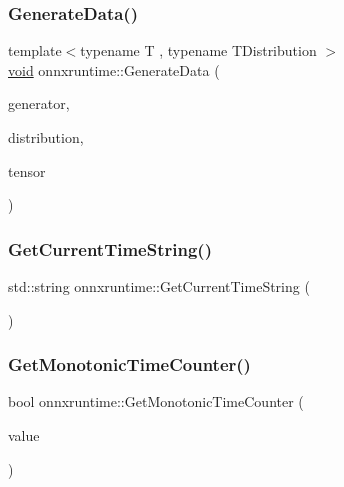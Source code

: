 \mbox{\label{namespaceonnxruntime_af375f3bf9afb474b936f8aa24dff75d8}} 
\subsubsection{\texorpdfstring{Generate\+Data()}{GenerateData()}\hspace{0.1cm}{\footnotesize\ttfamily [2/2]}}
{\footnotesize\ttfamily template$<$typename T , typename T\+Distribution $>$ \\
\mbox{\hyperlink{mlasi_8h_a88f941d423cb2a819b70a1358982b1a6}{void}} onnxruntime\+::\+Generate\+Data (\begin{DoxyParamCaption}\item[{std\+::default\+\_\+random\+\_\+engine}]{generator,  }\item[{T\+Distribution}]{distribution,  }\item[{\mbox{\hyperlink{classonnxruntime_1_1Tensor}{Tensor}} \&}]{tensor }\end{DoxyParamCaption})}

\mbox{\label{namespaceonnxruntime_aeded1386a822529bd9acd10c9148c04a}} 
\subsubsection{\texorpdfstring{Get\+Current\+Time\+String()}{GetCurrentTimeString()}}
{\footnotesize\ttfamily std\+::string onnxruntime\+::\+Get\+Current\+Time\+String (\begin{DoxyParamCaption}{ }\end{DoxyParamCaption})\hspace{0.3cm}{\ttfamily [inline]}}

\mbox{\label{namespaceonnxruntime_af6a8fa578d822eb4d52eaffbcded54cf}} 
\subsubsection{\texorpdfstring{Get\+Monotonic\+Time\+Counter()}{GetMonotonicTimeCounter()}}
{\footnotesize\ttfamily bool onnxruntime\+::\+Get\+Monotonic\+Time\+Counter (\begin{DoxyParamCaption}\item[{\mbox{\hyperlink{namespaceonnxruntime_ab69d87fbee3d0a327786f60db7c166e7}{T\+I\+M\+E\+\_\+\+S\+P\+EC}} $\ast$}]{value }\end{DoxyParamCaption})}

